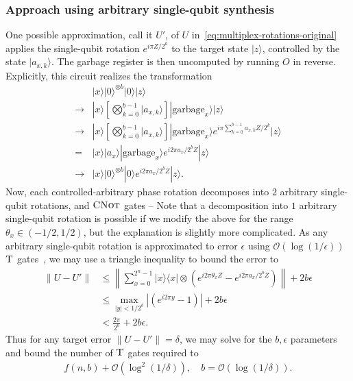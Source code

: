 \documentclass[a4paper,onecolumn,10pt,accepted=2024-05-22]{quantumarticle}
\newcommand{\ket}[1]{| #1\rangle}        %
\newcommand{\ketbra}[2]{| #1 \rangle\!\langle #2 |} %
\begin{document}
	\subsubsection{Approach using arbitrary single-qubit synthesis}
	One possible approximation, call it $U'$, of $U$ in~\cref{eq:multiplex-rotations-original} applies the single-qubit rotation
	$e^{i\pi Z/2^{k}}$ to the target state $\ket{z}$, controlled by the state $\ket{a_{x,k}}$. The garbage register is then uncomputed by running $O$ in reverse. Explicitly, this circuit realizes the transformation
	\begin{align}\nonumber
	\label{eq:multiplex-rotation-sequence}
	&\ket{x}\ket{0}^{\otimes b}\ket{0}\ket{z} \\\nonumber
	\rightarrow& \ket{x}\left[\bigotimes_{k=0}^{b-1}\ket{a_{x,k}}\right]\ket{\mathrm{garbage}_x}\ket{z}\\\nonumber
	\rightarrow& \ket{x}\left[\bigotimes_{k=0}^{b-1}\ket{a_{x,k}}\right]\ket{\mathrm{garbage}_x}e^{i\pi \sum^{b-1}_{k=0} a_{x,k}Z/2^{k}}\ket{z}\\\nonumber
	= & \ket{x}\ket{a_x}\ket{\mathrm{garbage}_x}e^{i2\pi a_x/2^{b}Z}\ket{z}\\
	\rightarrow& \ket{x}\ket{0}^{\otimes b}\ket{0}e^{i2\pi a_x/2^{b}Z}\ket{z}.
	\end{align}
	Now, each controlled-arbitrary phase rotation decomposes into $2$ arbitrary single-qubit rotations, and $\textsc{CNot}$ gates -- Note that a decomposition into $1$ arbitrary single-qubit rotation is possible if we modify the above for the range $\theta_x\in(-1/2,1/2)$, but the explanation is slightly more complicated.	As any arbitrary single-qubit rotation is approximated to error $\epsilon$ using $\mathcal{O}(\log{(1/\epsilon)})$ $\textsc{T}$ gates~\cite{Kliuchnikov2013Ancilla}, we may use a triangle inequality to bound the error to
	\begin{align}\nonumber
	\|U-U'\|&\le \left\|\sum_{x=0}^{2^{n}-1}\ketbra{x}{x}\otimes (e^{i2\pi \theta_{x}Z}-e^{i2\pi a_x/2^bZ})\right\|+2b\epsilon\\\nonumber
	&\le\max_{|y|<1/2^b}\left|(e^{i2\pi y}-1)\right|+2b\epsilon \\
	&<\frac{2\pi}{2^b}+2b\epsilon.
	\end{align}
	Thus for any target error $\|U-U'\|=\delta$, we may solve for the $b,\epsilon$ parameters and bound the number of $\textsc{T}$ gates required to
	\begin{align}
	f(n,b)+\mathcal{O}(\log^2{(1/\delta)}), \quad b=\mathcal{O}(\log{(1/\delta)}).
	\end{align}
	
\end{document}
